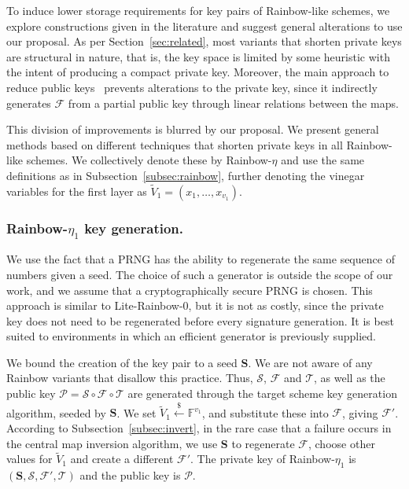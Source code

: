 \documentclass[draft, 12pt, a4paper, oneside]{memoir}
\newcommand{\random}{\stackrel{\$}{\longleftarrow}}
\theoremstyle{definition}
\begin{document}
To induce lower storage requirements for key pairs of Rainbow-like schemes, we
explore constructions given in the literature and suggest general alterations
to use our proposal. As per Section~\ref{sec:related}, most variants that
shorten private keys are structural in nature, that is, the key space is
limited by some heuristic with the intent of producing a compact private key.
Moreover, the main approach to reduce public keys~\cite{Petzoldt:201307}
prevents alterations to the private key,
since it indirectly generates $\mathcal{F}$ from a partial public key through
linear relations between the maps.

This division of improvements is blurred by our proposal. We present general
methods based on different techniques that shorten private keys in all
Rainbow-like schemes. We collectively denote these by Rainbow-$\eta$ and use
the same definitions as in Subsection~\ref{subsec:rainbow}, further denoting
the vinegar variables for the first layer as
$\widetilde{V}_{1} = (x_{1}, \dots, x_{v_{1}})$.

\subsubsection{Rainbow-$\eta_{1}$ key generation.}

We use the fact that a PRNG has the ability to regenerate the same sequence of
numbers given a seed. The choice of such a generator is outside the scope of
our work, and we assume that a cryptographically secure PRNG is chosen. This
approach is similar to Lite-Rainbow-0, but it is not as costly, since the
private key does not need to be regenerated before every signature generation.
It is best suited to environments in which an efficient generator is previously
supplied.

We bound the creation of the key pair to a seed $\mathbf{S}$. We are not aware
of any Rainbow variants that disallow this practice. Thus, $\mathcal{S}$,
$\mathcal{F}$ and $\mathcal{T}$, as well as the public key
$\mathcal{P} = \mathcal{S} \circ \mathcal{F} \circ \mathcal{T}$ are generated
through the target scheme key generation algorithm, seeded by $\mathbf{S}$. We
set $\widetilde{V}_{1} \random \mathbb{F}^{v_{1}}$, and substitute these into
$\mathcal{F}$, giving $\mathcal{F}'$. According to
Subsection~\ref{subsec:invert}, in the rare case that a
failure occurs in the central map inversion algorithm, we use $\mathbf{S}$ to
regenerate $\mathcal{F}$, choose other values for $\widetilde{V}_{1}$ and
create a different $\mathcal{F}'$. The private key of Rainbow-$\eta_{1}$ is
$(\mathbf{S}, \mathcal{S}, \mathcal{F}', \mathcal{T})$ and the public key is
$\mathcal{P}$.
\end{document}
